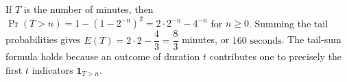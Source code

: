 If $ T $ is the number of minutes, then $\Pr(T>n)=1-(1-2^{-n})^2=2\cdot2^{-n}-4^{-n}$ for $ n\ge0 $. Summing the tail probabilities gives $ E(T)=2\cdot2-\dfrac{4}{3}=\dfrac{8}{3}$ minutes, or $\boxed{160\text{ seconds}}$. The tail-sum formula holds because an outcome of duration $ t $ contributes one to precisely the first $ t $ indicators $\mathbf1_{T>n}$.
